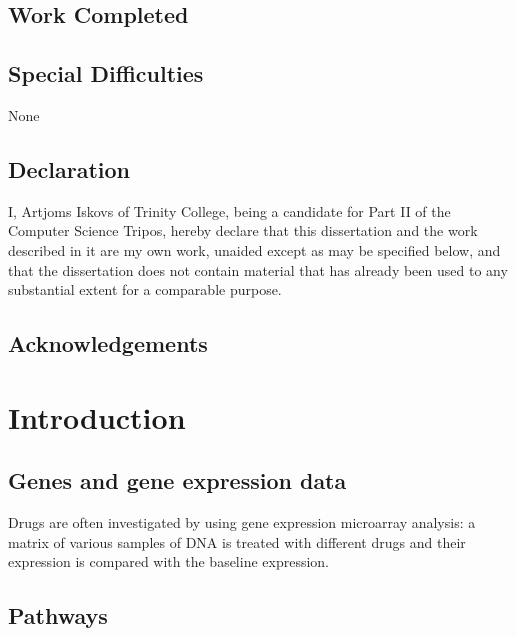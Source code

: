 \documentclass[12pt,a4paper,twoside,openright]{report}
\begin{document}
\section*{Work Completed}

\section*{Special Difficulties}
None
 
\newpage
\section*{Declaration}

I, Artjoms Iskovs of Trinity College, being a candidate for Part II of the Computer
Science Tripos, hereby declare that this dissertation and the work described in it are my own work,
unaided except as may be specified below, and that the dissertation does not contain material that has already been used to any substantial
extent for a comparable purpose.

\bigskip
{}

\medskip
{}

\tableofcontents

\listoffigures

\newpage
\section*{Acknowledgements}



\pagestyle{headings}

\chapter{Introduction}

\section{Genes and gene expression data}

Drugs are often investigated by using gene expression microarray analysis: a matrix of various samples of DNA is treated with different drugs and their expression is compared with the baseline expression.

\section{Pathways}
\end{document}
